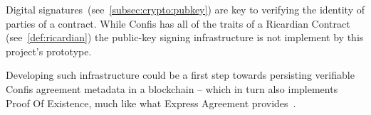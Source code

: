 Digital signatures~(see~\autoref{subsec:crypto:pubkey}) are key to verifying the identity of parties of a contract.
While Confis has all of the traits of a Ricardian Contract (see~\autoref{def:ricardian}) the public-key signing infrastructure is not implement by this project's prototype.

Developing such infrastructure could be a first step towards persisting verifiable Confis agreement metadata in a blockchain -- which in turn also implements Proof Of Existence, much like what Express Agreement provides~\cite{expressAgreement}.

